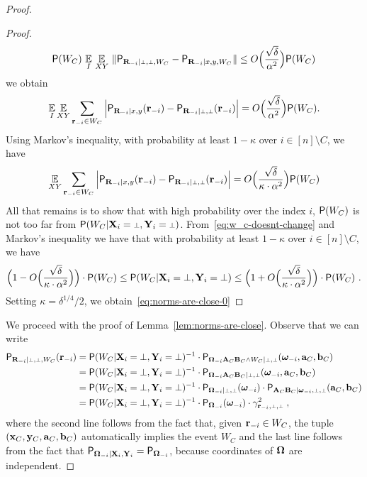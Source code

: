 \begin{proof}
\begin{proof}
$$
\P(W_C) \, \Ex_I \, \Ex_{XY} \,\|\P_{\bR_\mi | \dummy, \dummy, W_C} - \P_{\bR_\mi | x,y, W_C} \| \leq O\Big(\frac{\sqrt{\delta}}{\alpha^2}\Big) \P(W_C)
$$ 
we obtain 
$$\Ex_I \Ex_{XY} \sum_{\br_\mi \in W_C}  \Big | \P_{\bR_\mi | x,y}(\br_\mi) - \P_{\bR_\mi | \dummy, \dummy}(\br_\mi) \Big | = O\Big(\frac{\sqrt{\delta}}{\alpha^2}\Big) \P(W_C).$$ 
Using Markov's inequality, with probability at least $1 - \kappa$ over $i \in [n] \setminus C$, we have
\[
\Ex_{XY} \sum_{\br_\mi \in W_C}  \Big | \P_{\bR_\mi | x,y}(\br_\mi) - \P_{\bR_\mi | \dummy, \dummy}(\br_\mi) \Big | = O\Big(\frac{\sqrt{\delta}}{\kappa \cdot \alpha^2}\Big) \P(W_C)
\]
All that remains is to show that with high probability over the index $i$, $\P(W_C)$ is not too far from $\P(W_C | \bX_i = \dummy, \bY_i = \dummy)$. From~\eqref{eq:w_c-doesnt-change} and Markov's inequality we have that with probability at least $1 - \kappa$ over $i \in [n] \setminus C$, we have 
\[
	\Big (1 - O\Big(\frac{\sqrt{\delta}}{\kappa \cdot \alpha^2}\Big) \Big)  \cdot \P(W_C) \leq \P (W_C| \bX_i = \dummy,\bY_i = \dummy) \leq \Big (1 + O\Big(\frac{\sqrt{\delta}}{\kappa \cdot \alpha^2}\Big) \Big) \cdot \P(W_C)~.
\]
Setting $\kappa = \delta^{1/4}/2$, we obtain~\eqref{eq:norms-are-close-0}
\end{proof}

We proceed with the proof of Lemma~\ref{lem:norms-are-close}. 
Observe that we can write
	\begin{align*}
		\P_{\bR_\mi | \dummy, \dummy, W_C}(\br_\mi) &= \P(W_C |  \bX_i = \dummy, \bY_i = \dummy)^{-1} \cdot \P_{\bOmega_\mi \bA_C \bB_C \wedge W_C | \dummy, \dummy}(\bomega_\mi,\ba_C,\bb_C) \\
		&= \P(W_C | \bX_i = \dummy, \bY_i = \dummy)^{-1} \cdot \P_{\bOmega_\mi \bA_C \bB_C | \dummy, \dummy}(\bomega_\mi,\ba_C,\bb_C) \\
		&= \P(W_C | \bX_i = \dummy, \bY_i = \dummy)^{-1} \cdot \P_{\bOmega_\mi | \dummy, \dummy}(\bomega_\mi) \cdot \P_{\bA_C \bB_C | \bomega_\mi,\dummy, \dummy}(\ba_C,\bb_C) \\
		&= \P(W_C |\bX_i = \dummy, \bY_i = \dummy)^{-1} \cdot \P_{\bOmega_\mi}(\bomega_\mi) \cdot \gamma_{\br_\mi,\dummy,\dummy}^2 \;,
	\end{align*}
	where the second line follows from the fact that, given $\br_\mi \in W_C$, the tuple $(\bx_C,\by_C,\ba_C,\bb_C)$ automatically implies the event $W_C$ and the last line follows from the fact that $\P_{\bOmega_\mi | \bX_i,\bY_i} = \P_{\bOmega_\mi}$, because coordinates of $\bOmega$ are independent.
	

\end{proof}
